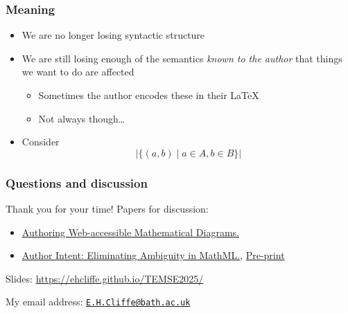 \documentclass[
  letterpaper,
  DIV=11,
  numbers=noendperiod]{scrartcl}
\providecommand{\tightlist}{%
  \setlength{\itemsep}{0pt}\setlength{\parskip}{0pt}}\usepackage{longtable,booktabs,array}
\begin{document}
\subsubsection{Meaning}\label{meaning}

\begin{itemize}
\tightlist
\item
  We are no longer losing syntactic structure
\item
  We are still losing enough of the semantics \emph{known to the author}
  that things we want to do are affected

  \begin{itemize}
  \tightlist
  \item
    Sometimes the author encodes these in their LaTeX
  \item
    Not always though\ldots{}
  \end{itemize}
\item
  Consider \[
  \lvert\{(a,b) \mid a \in A, b \in B\}\rvert
  \]
\end{itemize}

\subsubsection{Questions and discussion}\label{questions-and-discussion}

Thank you for your time! Papers for discussion:

\begin{itemize}
\tightlist
\item
  \href{https://doi.org/10.1145/3587281.3587297}{Authoring
  Web-accessible Mathematical Diagrams.}
\item
  \href{https://doi.org/10.1007/978-3-031-62846-7_21}{Author Intent:
  Eliminating Ambiguity in MathML.},
  \href{https://arxiv.org/abs/2407.06720}{Pre-print}
\end{itemize}

Slides: \url{https://ehcliffe.github.io/TEMSE2025/}

My email address:
\href{mailto:E.H.Cliffe@bath.ac.uk}{\nolinkurl{E.H.Cliffe@bath.ac.uk}}
\end{document}
